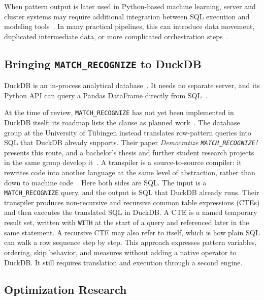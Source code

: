 When pattern output is later used in Python-based machine learning,
server and cluster systems may require additional integration between
SQL execution and modeling tools~\cite{
ML_Workflow,Makrynioti2019sql4mlAD}.  In many practical pipelines,
this can introduce data movement, duplicated intermediate data, or
more complicated orchestration steps~\cite{naphade2025evolution}.

\subsection{Bringing \texttt{MATCH\_RECOGNIZE} to DuckDB}
\label{subsec:related-duckdb}

DuckDB is an in-process analytical database~\cite{raasveldt2019duckdb}.
It needs no separate server, and its Python API can query a Pandas
DataFrame directly from SQL~\cite{duckdb2026pandas}.

At the time of review, \texttt{MATCH\_RECOGNIZE} has not yet been
implemented in DuckDB itself; its roadmap lists the clause as planned
work~\cite{duckdb2026roadmap}.  The database group at the University
of T\"ubingen instead translates row-pattern queries into SQL that
DuckDB already supports.  Their paper \emph{Democratize
\texttt{MATCH\_RECOGNIZE}!} presents this route, and a bachelor's
thesis and further student research projects in the same group develop
it~\cite{lambrecht2025democratize,findling2025bringing,TURP2,
TURP}.  A transpiler is a source-to-source
compiler: it rewrites code into another language at the same level of
abstraction, rather than down to machine
code~\cite{mogensen2024compiler}.  Here both sides are SQL.  The input
is a \texttt{MATCH\_RECOGNIZE} query, and the output is SQL that
DuckDB already runs.  Their transpiler produces non-recursive and
recursive common table expressions (CTEs) and then executes the
translated SQL in DuckDB.  A CTE is a named temporary result set,
written with \texttt{WITH} at the start of a query and referenced
later in the same statement.  A recursive CTE may also refer to
itself, which is how plain SQL can walk a row sequence step by step.
This approach expresses pattern variables, ordering, skip behavior,
and measures without adding a native operator to DuckDB.  It still
requires translation and execution through a second engine.

\subsection{Optimization Research}
\label{subsec:related-optimization}

